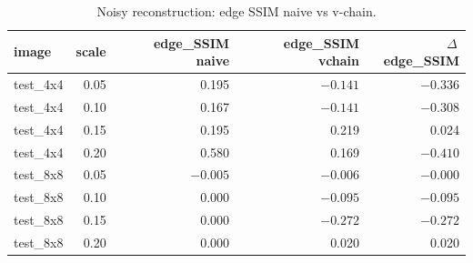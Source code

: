 
\begin{table}[htbp]
\centering
\caption{Noisy reconstruction: edge SSIM naive vs v-chain.}
\label{tab:noisy_edges_excerpt}
\footnotesize
\begin{tabular}{@{}lrrrr@{}}
\toprule
image & scale & edge\_SSIM naive & edge\_SSIM vchain & $\Delta$\,edge\_SSIM \\
\midrule
test\_4x4 & 0.05 & 0.195 & $-0.141$ & $-0.336$ \\
test\_4x4 & 0.10 & 0.167 & $-0.141$ & $-0.308$ \\
test\_4x4 & 0.15 & 0.195 & 0.219 & 0.024 \\
test\_4x4 & 0.20 & 0.580 & 0.169 & $-0.410$ \\
test\_8x8 & 0.05 & $-0.005$ & $-0.006$ & $-0.000$ \\
test\_8x8 & 0.10 & $0.000$ & $-0.095$ & $-0.095$ \\
test\_8x8 & 0.15 & $0.000$ & $-0.272$ & $-0.272$ \\
test\_8x8 & 0.20 & $0.000$ & 0.020 & 0.020 \\
\bottomrule
\end{tabular}
\end{table}
